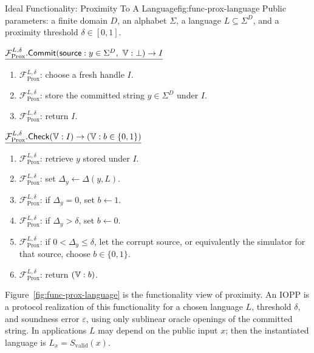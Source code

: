 \begin{protocolbox}{Ideal Functionality: Proximity To A Language}{fig:func-prox-language}
\noindent Public parameters: a finite domain \(D\), an alphabet \(\Sigma\), a
language \(L\subseteq\Sigma^D\), and a proximity threshold
\(\delta\in[0,1]\).

\smallskip
\noindent\(\underline{\mathcal F_{\mathrm{Prox}}^{L,\delta}.\mathsf{Commit}(\mathsf{source}:y\in\Sigma^D,\ \verifier:\bot)\to I}\)

\smallskip
\begin{enumerate}[leftmargin=0.24in,label=\textbf{S\arabic*.},itemsep=0.08em,topsep=0.1em,parsep=0pt]
  \item \(\mathcal F_{\mathrm{Prox}}^{L,\delta}\): choose a fresh handle \(I\).
  \item \(\mathcal F_{\mathrm{Prox}}^{L,\delta}\): store the committed string
        \(y\in\Sigma^D\) under \(I\).
  \item \(\mathcal F_{\mathrm{Prox}}^{L,\delta}\): return \(I\).
\end{enumerate}

\smallskip
\noindent\(\underline{\mathcal F_{\mathrm{Prox}}^{L,\delta}.\mathsf{Check}(\mathbb{V}:I)\to(\mathbb{V}:b\in\{0,1\})}\)

\smallskip
\begin{enumerate}[leftmargin=0.24in,label=\textbf{C\arabic*.},itemsep=0.08em,topsep=0.1em,parsep=0pt]
  \item \(\mathcal F_{\mathrm{Prox}}^{L,\delta}\): retrieve \(y\) stored under \(I\).
  \item \(\mathcal F_{\mathrm{Prox}}^{L,\delta}\): set
        \(\Delta_y\gets\Delta(y,L)\).
  \item \(\mathcal F_{\mathrm{Prox}}^{L,\delta}\): if \(\Delta_y=0\), set
        \(b\gets1\).
  \item \(\mathcal F_{\mathrm{Prox}}^{L,\delta}\): if \(\Delta_y>\delta\), set
        \(b\gets0\).
  \item \(\mathcal F_{\mathrm{Prox}}^{L,\delta}\): if
        \(0<\Delta_y\le\delta\), let the corrupt source, or equivalently the
        simulator for that source, choose \(b\in\{0,1\}\).
  \item \(\mathcal F_{\mathrm{Prox}}^{L,\delta}\): return \((\mathbb{V}:b)\).
\end{enumerate}
\end{protocolbox}

Figure~\ref{fig:func-prox-language} is the functionality view of proximity.
An IOPP is a protocol realization of this functionality for a chosen language
\(L\), threshold \(\delta\), and soundness error \(\varepsilon\), using only
sublinear oracle openings of the committed string.  In applications \(L\) may
depend on the public input \(x\); then the instantiated language is
\(L_x=S_{\mathrm{valid}}(x)\).


